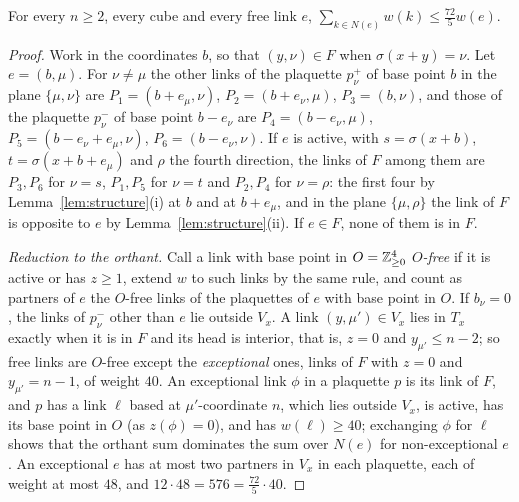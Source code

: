 \begin{proposition}\label{prop:weights}
For every $n\ge2$, every cube and every free link $e$,
$\sum_{k\in N(e)}w(k)\le\frac{72}5w(e)$.
\end{proposition}

\begin{proof}
Work in the coordinates $b$, so that $(y,\nu)\in F$ when $\sigma(x+y)=\nu$.
Let $e=(b,\mu)$. For $\nu\ne\mu$ the other links of the plaquette $p^+_\nu$ of
base point $b$ in the plane $\{\mu,\nu\}$ are $P_1=(b+e_\mu,\nu)$,
$P_2=(b+e_\nu,\mu)$, $P_3=(b,\nu)$, and those of the plaquette $p^-_\nu$ of base
point $b-e_\nu$ are $P_4=(b-e_\nu,\mu)$, $P_5=(b-e_\nu+e_\mu,\nu)$,
$P_6=(b-e_\nu,\nu)$. If $e$ is active, with $s=\sigma(x+b)$,
$t=\sigma(x+b+e_\mu)$ and $\rho$ the fourth direction, the links of $F$ among
them are $P_3,P_6$ for $\nu=s$, $P_1,P_5$ for $\nu=t$ and $P_2,P_4$ for
$\nu=\rho$: the first four by Lemma~\ref{lem:structure}(i) at $b$ and at
$b+e_\mu$, and in the plane $\{\mu,\rho\}$ the link of $F$ is opposite to $e$
by Lemma~\ref{lem:structure}(ii). If $e\in F$, none of them is in $F$.

\emph{Reduction to the orthant.} Call a link with base point in
$O=\mathbb{Z}^4_{\ge0}$ \emph{$O$-free} if it is active or has $z\ge1$, extend $w$ to
such links by the same rule, and count as partners of $e$ the $O$-free links
of the plaquettes of $e$ with base point in $O$. If $b_\nu=0$, the links of
$p^-_\nu$ other than $e$ lie outside $V_x$. A link $(y,\mu')\in V_x$ lies in
$T_x$ exactly when it is in $F$ and its head is interior, that is, $z=0$ and
$y_{\mu'}\le n-2$; so free links are $O$-free except the \emph{exceptional}
ones, links of $F$ with $z=0$ and $y_{\mu'}=n-1$, of weight $40$. An
exceptional link $\phi$ in a plaquette $p$ is its link of $F$, and $p$ has a
link $\ell$ based at $\mu'$-coordinate $n$, which lies outside $V_x$, is
active, has its base point in $O$ (as $z(\phi)=0$), and has $w(\ell)\ge40$;
exchanging $\phi$ for $\ell$ shows that the orthant sum dominates the sum over
$N(e)$ for non-exceptional $e$. An exceptional $e$ has at most two partners in
$V_x$ in each plaquette, each of weight at most $48$, and $12\cdot48=576=
\frac{72}5\cdot40$.


\end{proof}
